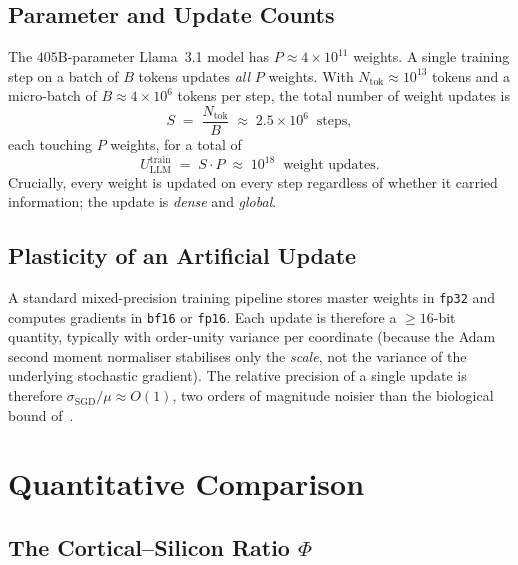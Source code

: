 \documentclass[11pt]{article}
\theoremstyle{definition}
\theoremstyle{remark}
\begin{document}
\subsection{Parameter and Update Counts}

The $405\mathrm{B}$-parameter Llama~3.1 model has
$P \approx 4\times 10^{11}$ weights.  A single training step on a
batch of $B$ tokens updates \emph{all} $P$ weights.  With
$N_{\mathrm{tok}}\approx 10^{13}$ tokens and a micro-batch of
$B\approx 4\times 10^{6}$ tokens per step, the total number of
weight updates is
\[
  S \;=\; \frac{N_{\mathrm{tok}}}{B}
  \;\approx\; 2.5\times 10^{6}\;\;\text{steps},
\]
each touching $P$ weights, for a total of
\[
  U_{\mathrm{LLM}}^{\mathrm{train}}
  \;=\; S\cdot P \;\approx\; 10^{18}
  \;\;\text{weight updates}.
\]
Crucially, every weight is updated on every step regardless of whether
it carried information; the update is \emph{dense} and \emph{global}.

\subsection{Plasticity of an Artificial Update}

A standard mixed-precision training pipeline stores master weights in
\texttt{fp32} and computes gradients in \texttt{bf16} or
\texttt{fp16}.  Each update is therefore a $\ge\!16$-bit quantity,
typically with order-unity variance per coordinate (because the
Adam~\cite{kingma2015adam} second moment normaliser stabilises only the
\emph{scale}, not the variance of the underlying stochastic gradient).
The relative precision of a single update is therefore
$\sigma_{\mathrm{SGD}}/\mu \approx O(1)$, two orders of magnitude
noisier than the biological bound of~\cite{bartol2015nanoconnectomic}.

\section{Quantitative Comparison}
\label{sec:gap}

\subsection{The Cortical--Silicon Ratio $\Phi$}
\end{document}
